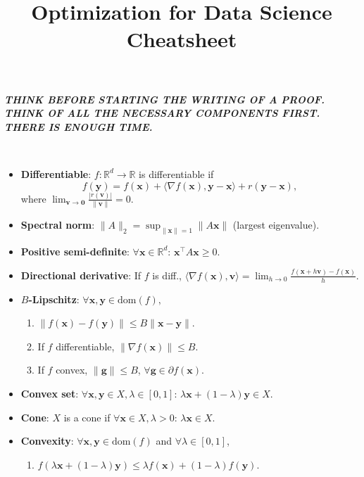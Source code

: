 \documentclass[8pt,a4paper]{extarticle}
\title{Optimization for Data Science Cheatsheet}
\newcommand{\R}{\mathbb{R}}
\renewcommand{\vec}[1]{\bm{#1}}
\newcommand{\mat}[1]{#1}
\newcommand{\dom}[1]{\mathrm{dom}(#1)}
\newenvironment{topic}[1]
{\textbf{\sffamily \colorbox{black}{\rlap{\textbf{\textcolor{white}{#1}}}\hspace{\linewidth}\hspace{-2\fboxsep}}} \\ \vspace{0.2cm}}
{}
\begin{document}
\setlength{\columnsep}{0.2cm}

\begin{multicols*}{2}
    \textbf{\textit{THINK BEFORE STARTING THE WRITING OF A PROOF. THINK OF ALL THE NECESSARY COMPONENTS FIRST. THERE IS ENOUGH TIME.}}

    \begin{topic}{Definitions}
        \begin{itemize}
            \item \textbf{Differentiable}: $f: \R^d \to \R$ is differentiable if \[
                      f(\vec{y}) = f(\vec{x}) + \langle \nabla f(\vec{x}), \vec{y} - \vec{x} \rangle + r(\vec{y} - \vec{x}),
                  \]
                  where $\lim_{\vec{v} \to \vec{0}} \frac{| r(\vec{v}) |}{\| \vec{v} \|} = 0$.
            \item \textbf{Spectral norm}: $\| \mat{A} \|_2 = \sup_{\| \vec{x} \| = 1} \| \mat{A} \vec{x} \|$ (largest eigenvalue).
            \item \textbf{Positive semi-definite}: $\forall \vec{x} \in \R^d$: $\vec{x}^\top \mat{A} \vec{x} \geq 0$.
            \item \textbf{Directional derivative}: If $f$ is diff., $\langle \nabla f(\vec{x}), \vec{v} \rangle = \lim_{h \to 0} \frac{f(\vec{x} + h \vec{v}) - f(\vec{x})}{h}$.
            \item \textbf{$B$-Lipschitz}: $\forall \vec{x}, \vec{y} \in \dom{f},$
                  \begin{enumerate}
                      \item $\| f(\vec{x}) - f(\vec{y}) \| \leq B \| \vec{x} - \vec{y} \|$.
                      \item If $f$ differentiable, $\| \nabla f(\vec{x}) \| \leq B$.
                      \item If $f$ convex, $\| \vec{g} \| \leq B$, $\forall \vec{g} \in \partial f(\vec{x})$.
                  \end{enumerate}
            \item \textbf{Convex set}: $\forall \vec{x}, \vec{y} \in X, \lambda \in [0,1]$: $\lambda \vec{x} + (1-\lambda) \vec{y} \in X$.
            \item \textbf{Cone}: $X$ is a cone if $\forall \vec{x} \in X, \lambda > 0$: $\lambda \vec{x} \in X$.
            \item \textbf{Convexity}: $\forall \vec{x}, \vec{y} \in \dom{f}$ and $\forall \lambda \in [0,1]$,
                  \begin{enumerate}
                      \item $f(\lambda \vec{x} + (1-\lambda)\vec{y}) \leq \lambda f(\vec{x}) + (1-\lambda) f(\vec{y})$.

\end{enumerate}
\end{itemize}
\end{topic}
\end{multicols*}
\end{document}
